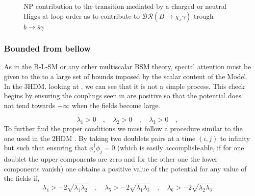 \begin{figure}[H]
{            }
            \hspace{1.3cm}
            \hspace{0.8cm}
\vspace{0.2cm}
\caption{NP contribution to the transition mediated by a charged or neutral Higgs at loop order as to contribute to $\mathcal{BR} (B \rightarrow \chi_s \gamma)$ trough $b \rightarrow \bar{s} \gamma$ }
\label{fig:3HDMChiSGamma}
\end{figure}





\subsubsection{Bounded from bellow}

As in the B-L-SM or any other multiscalar BSM theory, special attention must be given to the to a large set of bounds imposed by the scalar content of the Model. 
%
In the 3HDM, looking at , we can see that it is not a simple process. This check begins by ensuring the couplings seen in  are positive so that the potential does not tend towards $-\infty$ when the fields become large. 

\begin{equation}
\label{Unbound_Stage_1}
\lambda_1 > 0  \quad , \quad \lambda_2 > 0 \quad , \quad \lambda_3 > 0 \quad , 
\end{equation}
%
To further find the proper conditions we must follow a procedure similar to the one used in the 2HDM \cite{Branco_1996}.
%
By taking two doublets pairs at a time $(i, j)$ to infinity but such that ensuring that $\phi_i^\dagger \phi_j = 0$ (which is easily accomplish-able, if for one doublet the upper components are zero and for the other one the lower components vanish) one obtains a positive value of the potential for any value of the fields if,
%
\begin{equation}
\lambda_4 > -2 \sqrt{\lambda_1 \lambda_2} \quad , \quad \lambda_5 > -2 \sqrt{\lambda_1 \lambda_3} \quad , \quad \lambda_6 > -2 \sqrt{\lambda_2 \lambda_3}
\end{equation}
%


